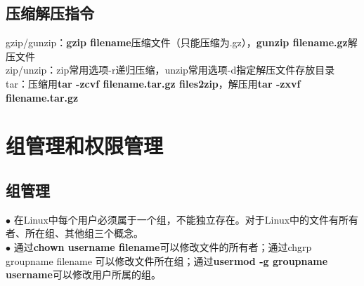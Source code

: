 \documentclass[11pt]{article}
\begin{document}
\subsection{压缩解压指令}
gzip/gunzip：\textbf{gzip filename}压缩文件（只能压缩为.gz），\textbf{gunzip filename.gz}解压文件  \\
zip/unzip：zip常用选项-r递归压缩，unzip常用选项-d指定解压文件存放目录  \\
tar：压缩用\textbf{tar -zcvf filename.tar.gz files2zip}，解压用\textbf{tar -zxvf filename.tar.gz}

\section{组管理和权限管理}

\subsection{组管理}
$\bullet$ 在Linux中每个用户必须属于一个组，不能独立存在。对于Linux中的文件有所有者、所在组、其他组三个概念。  \\
$\bullet$ 通过\textbf{chown username filename}可以修改文件的所有者；通过chgrp groupname filename
可以修改文件所在组；通过\textbf{usermod -g groupname username}可以修改用户所属的组。
\end{document}
